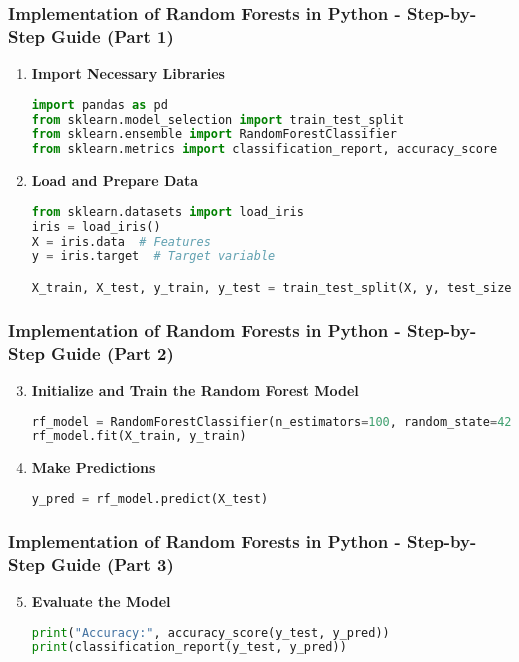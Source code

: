 \documentclass[aspectratio=169]{beamer}
\begin{document}
\begin{frame}[fragile]
    \frametitle{Implementation of Random Forests in Python - Step-by-Step Guide (Part 1)}
    \begin{enumerate}
        \item \textbf{Import Necessary Libraries}
        \begin{lstlisting}[language=Python]
import pandas as pd
from sklearn.model_selection import train_test_split
from sklearn.ensemble import RandomForestClassifier
from sklearn.metrics import classification_report, accuracy_score
        \end{lstlisting}
        
        \item \textbf{Load and Prepare Data}
        \begin{lstlisting}[language=Python]
from sklearn.datasets import load_iris
iris = load_iris()
X = iris.data  # Features
y = iris.target  # Target variable

X_train, X_test, y_train, y_test = train_test_split(X, y, test_size=0.2, random_state=42)
        \end{lstlisting}
    \end{enumerate}
\end{frame}

\begin{frame}[fragile]
    \frametitle{Implementation of Random Forests in Python - Step-by-Step Guide (Part 2)}
    \begin{enumerate}
        \setcounter{enumi}{2} %
        \item \textbf{Initialize and Train the Random Forest Model}
        \begin{lstlisting}[language=Python]
rf_model = RandomForestClassifier(n_estimators=100, random_state=42)
rf_model.fit(X_train, y_train)
        \end{lstlisting}

        \item \textbf{Make Predictions}
        \begin{lstlisting}[language=Python]
y_pred = rf_model.predict(X_test)
        \end{lstlisting}
    \end{enumerate}
\end{frame}

\begin{frame}[fragile]
    \frametitle{Implementation of Random Forests in Python - Step-by-Step Guide (Part 3)}
    \begin{enumerate}
        \setcounter{enumi}{4} %
        \item \textbf{Evaluate the Model}
        \begin{lstlisting}[language=Python]
print("Accuracy:", accuracy_score(y_test, y_pred))
print(classification_report(y_test, y_pred))
        \end{lstlisting}
    \end{enumerate}
\end{frame}
\end{document}
